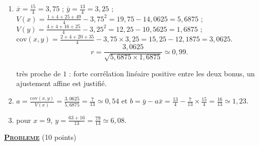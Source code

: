 \begin{description}
\begin{enumerate}
\begin{enumerate}
					\end{enumerate}
			\end{enumerate}
		\item[B.]
			\begin{enumerate}
				\item {}
					$\bar{x} = \frac{15}{4} = 3{,}75$ ; $\bar{y} = \frac{13}{4} = 3{,}25$ ;
					$V(x) = \frac{1 + 4 + 25 + 49}{4} - 3{,}75^2 = 19{,}75 - 14{,}0625 = 5{,}6875$ ;
					$V(y) = \frac{4 + 4 + 16 + 25}{4} - 3{,}25^2 = 12{,}25 - 10{,}5625 = 1{,}6875$ ;
					$\mathrm{cov}(x,y) = \frac{2 + 4 + 20 + 35}{4} - 3{,}75\times3{,}25 = 15{,}25 - 12{,}1875 = 3{,}0625$.
					\[
						r = \frac{3{,}0625}{\sqrt{5{,}6875\times1{,}6875}} \simeq 0{,}99.
					\]


					très proche de $1$ : forte corrélation linéaire positive entre les deux bonus, un ajustement affine est justifié.
				\item {}
					$a = \frac{\mathrm{cov}(x,y)}{V(x)} = \frac{3{,}0625}{5{,}6875} = \frac{7}{13} \simeq 0{,}54$ et
					$b = \bar{y} - a\bar{x} = \frac{13}{4} - \frac{7}{13}\times\frac{15}{4} = \frac{16}{13} \simeq 1{,}23$.

				\item {} pour $x = 9$, $y = \frac{63 + 16}{13} = \frac{79}{13} \simeq 6{,}08$.

			\end{enumerate}
	\end{description}
\noindent \underline{\textsc{\textbf{Probleme}}} (10 points)
